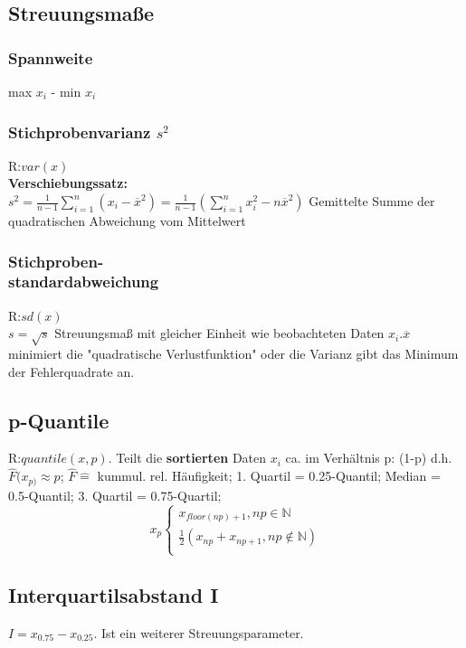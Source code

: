   \subsection{Streuungsmaße}
    \subsubsection{Spannweite}
    max $x_{i}$ - min $x_{i}$
    \subsubsection{Stichprobenvarianz $s^2$}
    R:$var(x)$\\
    \textbf{Verschiebungssatz:}\\
      $s^2 = \frac{1}{n-1} \sum_{i=1}^{n}(x_{i} - \overline{x}^2) = \frac{1}{n-1} (\sum_{i=1}^{n} x_{i}^2 - n\overline{x}^2)$
      Gemittelte Summe der quadratischen Abweichung vom Mittelwert
      \subsubsection{Stichproben-\\standardabweichung}
      R:$sd(x)$\\
      $s=\sqrt{s}$
      Streuungsmaß mit gleicher Einheit wie beobachteten Daten $x_{i}$.$ \overline{x}$ minimiert die "quadratische Verlustfunktion" oder die Varianz gibt das Minimum der Fehlerquadrate an.
      \subsection{p-Quantile}
      R:$quantile(x,p)$. Teilt die \textbf{sortierten} Daten $x_{i}$ ca. im Verhältnis p: (1-p) d.h. $\hat{F}(x_{p)} \approx p$; 
      $\hat{F} \hat{=} $ kummul. rel. Häufigkeit; 
      1. Quartil = 0.25-Quantil; 
      Median = 0.5-Quantil; 
      3. Quartil = 0.75-Quartil; 
      \begin{equation}
      	x_{p}
        \begin{cases}
          x_{floor(np) +1} , np \in \mathbb{N}\\
          \frac{1}{2} (x_{np} + x_{np+1}, np \notin \mathbb{N})\\
        \end{cases}
      \end{equation}
      \subsection{Interquartilsabstand I}
      $I = x_{0.75} - x_{0.25}$. Ist ein weiterer Streuungsparameter.
